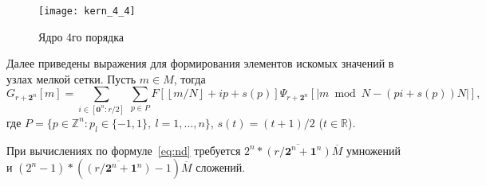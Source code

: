 \begin{figure}[h!]
  \centering
  \texttt{[image: kern\_4\_4]} 
  \caption{Ядро 4го порядка}
  \label{fig:reg_net}
\end{figure}
\FloatBarrier


 Далее приведены выражения для формирования
 элементов искомых значений в узлах мелкой сетки.
Пусть $m\in M$, тогда
\begin{equation}
  \label{eq:nd}
    G_{r+\mathbf{2}^n}[m] = 
    \sum_{i \in  [\mathbf{0}^n:r/2]}\ \sum_{p\in P} 
        F \left[ \left \lfloor {m}/{N} \right \rfloor + ip + s(p)\right]
      \Psi_{r+\mathbf{2}^n}[|m\bmod N - (pi + s(p))N|],
\end{equation}
где $P=\{p\in\mathbb{Z}^n: p_l\in\{-1,1\},\ l=1,\ldots,n\}$, $s(t)=(t+1)/2$
($t\in\mathbb{R}$).


При вычислениях по формуле~\eqref{eq:nd} требуется
$2^n * \overline{(r/\mathbf{2}^n+\mathbf{1}^n)} \overline{M}$
умножений и
$(2^n-1) * (\overline{(r/\mathbf{2}^n+\mathbf{1}^n)} -1)  \overline{M}$
сложений. 




